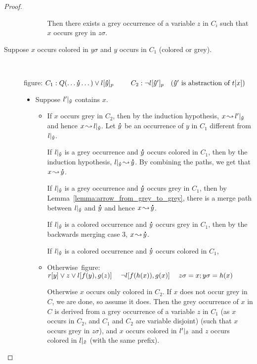 \documentclass[,%
	paper=a4,%
	DIV11, %
	twoside=false,%
	liststotoc,
	bibtotoc,
	draft=false,%
	numbers=noendperiod
]{scrartcl}
\begin{document}
\begin{proof}
\begin{description}
\begin{itemize}
\begin{itemize}
							Then there exists a grey occurrence of a variable $z$ in $C_i$ such that $x$ occurs grey in $z\sigma$.


					\end{itemize}



			\end{itemize}

		\item[Suppose $x$ occurs colored in $y\sigma$ and $y$ occurs in $C_1$ (colored or grey).]
			~

			figure:
			$C_1: Q(\dots \bdot y \dots) \lor l\occat{\bhat y}{p}\quad\quad$
			$C_2: \lnot l{[\bm\hat y']_{p}}\quad(\bm\hat y' \text{ is abstraction of } t[x])$


			\begin{itemize}
				\item Suppose $l'|_{\bm\hat y}$ contains $x$.
					\begin{itemize}
							\item
					If $x$ occurs grey in $C_2$, then by the induction hypothesis,
					$x\operatorname{\leadsto} l'|_{\bm\hat y}$ and hence 
					$x\operatorname{\leadsto} l|_{\bm\hat y}$. Let $\bm\dot y$ be an occurrence of $y$ in $C_1$ different from $l|_{\bm\hat y}$.

					If $l|_{\bm\hat y}$ is a grey occurrence and $\bm\dot y$ occurs colored in $C_1$, then by the induction hypothesis, $l|_{\bm\hat y} \operatorname{\leadsto} \bm\dot y$. By combining the paths, we get that $x\operatorname{\leadsto} \bm\dot y$.

					If $l|_{\bm\hat y}$ is a grey occurrence and $\bm\dot y$ occurs grey in $C_1$, then by Lemma~\ref{lemma:arrow_from_grey_to_grey}, there is a merge path between $l|_{\bm\hat y}$ and $\bm\dot y$ and hence $x\operatorname{\leadsto} \bm\dot y$.


					If $l|_{\bm\hat y}$ is a colored occurrence and $\bm\dot y$ occurs grey in $C_1$, then by the backwards merging case 3, $x\operatorname{\leadsto} \bm\dot y$.

					If $l|_{\bm\hat y}$ is a colored occurrence and $\bm\dot y$ occurs colored in $C_1$,  

					\item
					\mbox{Otherwise figure: $ r[y] \lor z \lor l[f(y), g(z)]\quad\; \lnot l[f(h(x)), g(x)]\;\quad z\sigma = x;y\sigma=h(x)$}


					Otherwise $x$ occurs only colored in $C_2$.
					If $x$ does not occur grey in $C$, we are done, so assume it does.
					Then the grey occurrence of $x$ in $C$ is derived from a grey occurrence of a variable $z$ in $C_1$ (as $x$ occurs in $C_2$, and $C_1$ and $C_2$ are variable disjoint)   (such that $x$ occurs grey in $z\sigma$), and $x$ occurs colored in $l'|_{\bm\hat x}$ and $z$ occurs colored in $l|_{\bm\hat x}$ (with the same prefix).


\end{itemize}
\end{itemize}
\end{description}
\end{proof}
\end{document}
